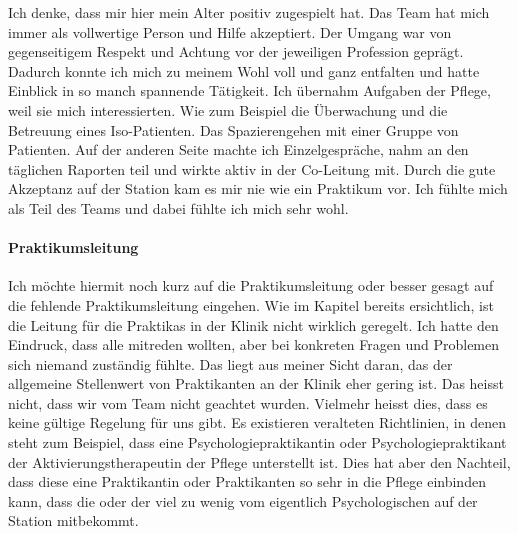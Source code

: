 Ich denke, dass mir hier mein Alter positiv zugespielt hat. Das Team hat mich immer als vollwertige Person und Hilfe akzeptiert. Der Umgang war von gegenseitigem Respekt und Achtung vor der jeweiligen Profession geprägt. Dadurch konnte ich mich zu meinem Wohl voll und ganz entfalten und hatte Einblick in so manch spannende Tätigkeit. Ich übernahm Aufgaben der Pflege, weil sie mich interessierten. Wie zum Beispiel die Überwachung und die Betreuung eines Iso-Patienten. Das Spazierengehen mit einer Gruppe von Patienten. Auf der anderen Seite machte ich Einzelgespräche, nahm an den täglichen Raporten teil und wirkte aktiv in der Co-Leitung mit. Durch die gute Akzeptanz auf der Station kam es mir nie wie ein Praktikum vor. Ich fühlte mich als Teil des Teams und dabei fühlte ich mich sehr wohl.  

\paragraph{Praktikumsleitung}
Ich möchte hiermit noch kurz auf die Praktikumsleitung oder besser gesagt auf die fehlende Praktikumsleitung eingehen. Wie im Kapitel  bereits ersichtlich, ist die Leitung für die Praktikas in der Klinik nicht wirklich geregelt. Ich hatte den Eindruck, dass alle mitreden wollten, aber bei konkreten Fragen und Problemen sich niemand zuständig fühlte. Das liegt aus meiner Sicht daran, das der allgemeine Stellenwert von Praktikanten an der Klinik eher gering ist. Das heisst nicht, dass wir vom Team nicht geachtet wurden. Vielmehr heisst dies, dass es keine gültige Regelung für uns gibt. Es existieren veralteten Richtlinien, in denen steht zum Beispiel, dass eine Psychologiepraktikantin oder Psychologiepraktikant der Aktivierungstherapeutin der Pflege unterstellt ist. Dies hat aber den Nachteil, dass diese eine Praktikantin oder Praktikanten so sehr in die Pflege einbinden kann, dass die oder der viel zu wenig vom eigentlich Psychologischen auf der Station mitbekommt. 


